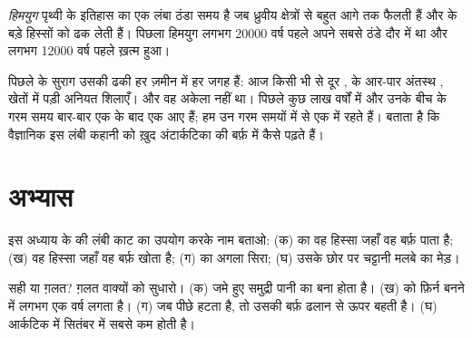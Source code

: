 \begin{definition}[हिमयुग]\label{def:g8:ice-on-earth:ice-age}
\emph{हिमयुग} पृथ्वी के इतिहास का एक लंबा ठंडा समय है जब 
ध्रुवीय क्षेत्रों से बहुत आगे तक फैलती हैं और  के बड़े हिस्सों को ढक लेती हैं।
पिछला हिमयुग लगभग \num{20000} वर्ष पहले अपने सबसे ठंडे दौर में था और लगभग
\num{12000} वर्ष पहले ख़त्म हुआ।
\end{definition}

पिछले  के सुराग उसकी ढकी हर ज़मीन में हर जगह हैं: आज किसी भी  से दूर
,  के आर-पार अंतस्थ , खेतों में पड़ी अनियत शिलाएँ। और वह
अकेला नहीं था। पिछले कुछ लाख वर्षों में  और उनके बीच के गरम समय बार-बार एक के
बाद एक आए हैं; हम उन गरम समयों में से एक में रहते हैं।
 बताता है कि वैज्ञानिक इस लंबी कहानी को ख़ुद
अंटार्कटिका की बर्फ़ में कैसे पढ़ते
हैं।

\section{अभ्यास}

\begin{exercise}[$\star$]\label{exo:g8:ice-on-earth:1}
इस अध्याय के  की लंबी काट का उपयोग करके नाम बताओ: (क)  का वह हिस्सा जहाँ वह
बर्फ़ पाता है; (ख) वह हिस्सा जहाँ वह बर्फ़ खोता है; (ग)  का अगला सिरा; (घ) उसके
छोर पर चट्टानी मलबे का मेड़।
\end{exercise}

\begin{exercise}[$\star$]\label{exo:g8:ice-on-earth:2}
सही या ग़लत? ग़लत वाक्यों को सुधारो। (क)  जमे हुए समुद्री पानी का बना होता है।
(ख)  को फ़िर्न बनने में लगभग एक वर्ष लगता है। (ग) जब  पीछे हटता है, तो उसकी
बर्फ़ ढलान से ऊपर बहती है। (घ) आर्कटिक में  सितंबर में सबसे कम होती
है।
\end{exercise}

